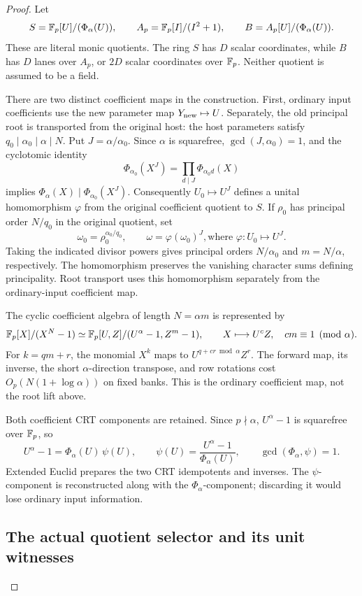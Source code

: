 \begin{proof}
Let
\[
  S=\mathbb F_p[U]/(\Phi_\alpha(U)),\qquad
  A_p=\mathbb F_p[I]/(I^2+1),\qquad
  B=A_p[U]/(\Phi_\alpha(U)).
\]
These are literal monic quotients.  The ring $S$ has $D$ scalar
coordinates, while $B$ has $D$ lanes over $A_p$, or $2D$ scalar
coordinates over $\mathbb F_p$.  Neither quotient is assumed to be a field.

There are two distinct coefficient maps in the construction.  First,
ordinary input coefficients use the new parameter map $Y_{\rm new}\mapsto U$.
Separately, the old principal root is transported from the original host:
the host parameters satisfy $q_0\mid\alpha_0\mid\alpha\mid N$.
Put $J=\alpha/\alpha_0$. Since $\alpha$ is squarefree,
$\gcd(J,\alpha_0)=1$, and the cyclotomic identity
\[
  \Phi_{\alpha_0}(X^J)=\prod_{d\mid J}\Phi_{\alpha_0d}(X)
\]
implies $\Phi_\alpha(X)\mid\Phi_{\alpha_0}(X^J)$.
Consequently $U_0\mapsto U^J$ defines a unital homomorphism
$\varphi$ from the original coefficient quotient to $S$.
If $\rho_0$ has principal order $N/q_0$ in the original quotient, set
\[
  \omega_0=\rho_0^{\alpha_0/q_0},\qquad
  \omega=\varphi(\omega_0)^J,
  \text{where }\varphi:U_0\longmapsto U^J.
\]
Taking the indicated divisor powers gives principal orders
$N/\alpha_0$ and $m=N/\alpha$, respectively. The homomorphism preserves
the vanishing character sums defining principality. Root transport uses
this homomorphism separately from the ordinary-input coefficient map.

The cyclic coefficient algebra of length $N=\alpha m$ is represented by
\[
  \mathbb F_p[X]/(X^N-1)\simeq
  \mathbb F_p[U,Z]/(U^\alpha-1,Z^m-1),
  \qquad X\longmapsto U^c Z,
  \quad cm\equiv1\pmod\alpha.
\]
For $k=qm+r$, the monomial $X^k$ maps to
$U^{q+cr\bmod\alpha}Z^r$.  The forward map, its inverse, the short
$\alpha$-direction transpose, and row rotations cost
$O_p(N(1+\log\alpha))$ on fixed banks.  This is the ordinary coefficient
map, not the root lift above.

Both coefficient CRT components are retained.  Since $p\nmid\alpha$,
$U^\alpha-1$ is squarefree over $\mathbb F_p$, so
\[
  U^\alpha-1=\Phi_\alpha(U)\,\psi(U),\qquad
  \psi(U)=\frac{U^\alpha-1}{\Phi_\alpha(U)},\qquad
  \gcd(\Phi_\alpha,\psi)=1.
\]
Extended Euclid prepares the two CRT idempotents and inverses.  The
$\psi$-component is reconstructed along with the $\Phi_\alpha$-component;
discarding it would lose ordinary input information.

\subsection{The actual quotient selector and its unit witnesses}
\label{upd:selector}


\end{proof}
